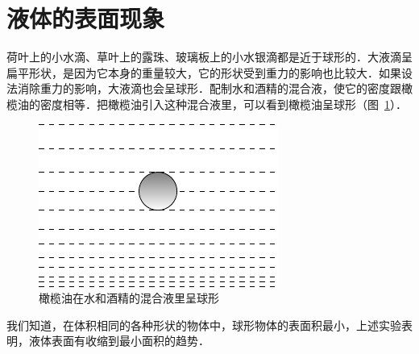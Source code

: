 \section{液体的表面现象}
荷叶上的小水滴、草叶上的露珠、玻璃板上的小水银滴都是近于球形的．大液滴呈扁平形状，是因为它本身的重量较大，它的形状受到重力的影响也比较大．如果设法消除重力的影响，大液滴也会呈球形．配制水和酒精的混合液，使它的密度跟橄榄油的密度相等．把橄榄油引入这种混合液里，可以看到橄榄油呈球形（图~\ref{fig_B_4-8}）．
\begin{figure}[htbp]
    \centering
    \includegraphics{fig/B/4-8.pdf}
    \caption{橄榄油在水和酒精的混合液里呈球形}\label{fig_B_4-8}
\end{figure}

我们知道，在体积相同的各种形状的物体中，球形物体的表面积最小，上述实验表明，液体表面有收缩到最小面积的趋势．

